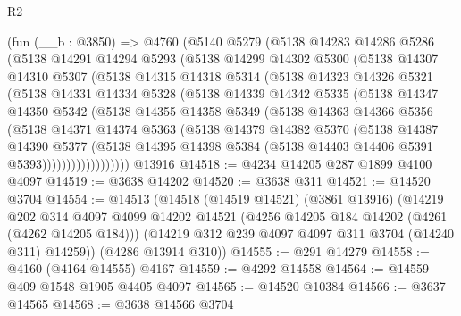 \begin{lexlean}{R2}
\begin{coremodule}
    (fun (__b : @3850) =>
    @4760
      (@5140
        @5279
        (@5138
          @14283
          @14286
          @5286
          (@5138
            @14291
            @14294
            @5293
            (@5138
              @14299
              @14302
              @5300
              (@5138
                @14307
                @14310
                @5307
                (@5138
                  @14315
                  @14318
                  @5314
                  (@5138
                    @14323
                    @14326
                    @5321
                    (@5138
                      @14331
                      @14334
                      @5328
                      (@5138
                        @14339
                        @14342
                        @5335
                        (@5138
                          @14347
                          @14350
                          @5342
                          (@5138
                            @14355
                            @14358
                            @5349
                            (@5138
                              @14363
                              @14366
                              @5356
                              (@5138
                                @14371
                                @14374
                                @5363
                                (@5138
                                  @14379
                                  @14382
                                  @5370
                                  (@5138
                                    @14387
                                    @14390
                                    @5377
                                    (@5138
                                      @14395
                                      @14398
                                      @5384
                                      (@5138 @14403 @14406 @5391 @5393))))))))))))))))))
    @13916
@14518 := @4234 @14205 @287 @1899 @4100 @4097
@14519 := @3638 @14202
@14520 := @3638 @311
@14521 := @14520 @3704
@14554 := @14513
    (@14518
      (@14519 @14521)
      (@3861 @13916)
      (@14219
        @202
        @314
        @4097
        @4099
        @14202
        @14521
        (@4256 @14205 @184 @14202 (@4261 (@4262 @14205 @184)))
        (@14219 @312 @239 @4097 @4097 @311 @3704 (@14240 @311) @14259))
      (@4286 @13914 @310))
@14555 := @291 @14279
@14558 := @4160 (@4164 @14555) @4167
@14559 := @4292 @14558
@14564 := @14559 @409 @1548 @1905 @4405 @4097
@14565 := @14520 @10384
@14566 := @3637 @14565
@14568 := @3638 @14566 @3704

\end{coremodule}
\end{lexlean}
